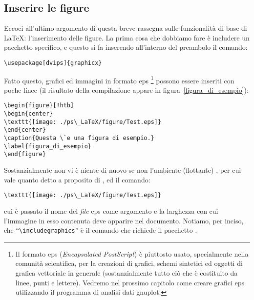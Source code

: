 \subsection{Inserire le figure}

Eccoci all'ultimo argomento di questa breve rassegna sulle funzionalit\`a di
base di \LaTeX: l'inserimento delle figure.
La prima cosa che dobbiamo fare \`e includere un pacchetto specifico, e
questo si fa inserendo all'interno del preambolo il comando:
\begin{verbatim}
\usepackage[dvips]{graphicx}
\end{verbatim}
Fatto questo, grafici ed immagini in formato eps%
\footnote{
Il formato eps (\emph{Encapsulated PostScript}) \`e piuttosto usato,
specialmente nella comunit\`a scientifica, per la creazioni di grafici,
schemi sintetici ed oggetti di grafica vettoriale in generale (sostanzialmente
tutto ci\`o che \`e costituito da linee, punti e lettere).
Vedremo nel prossimo capitolo come creare grafici eps utilizzando il programma
di analisi dati gnuplot.
}
possono essere inseriti con poche linee (il risultato della compilazione
appare in figura~\ref{figura_di_esempio}):
\begin{verbatim}
\begin{figure}[!htb]
\begin{center}
\texttt{[image: ./ps\_LaTeX/figure/Test.eps]}
\end{center}
\caption{Questa \`e una figura di esempio.}
\label{figura_di_esempio}
\end{figure}
\end{verbatim}

Sostanzialmente non vi \`e niente di nuovo se non l'ambiente (flottante)
, per cui vale quanto detto a proposito di ,
ed il comando:
\begin{verbatim}
\texttt{[image: ./ps\_LaTeX/figure/Test.eps]}
\end{verbatim}
cui \`e passato il nome del \emph{file} eps come argomento e la larghezza
con cui l'immagine in esso contenuta deve apparire nel documento.
Notiamo, per inciso, che ``\verb|\includegraphics|'' \`e il comando che
richiede il pacchetto .

